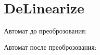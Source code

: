 \section{DeLinearize}
\begin{frame}{}
	Автомат до преоброзования:


	Автомат после преоброзования:

\end{frame}
